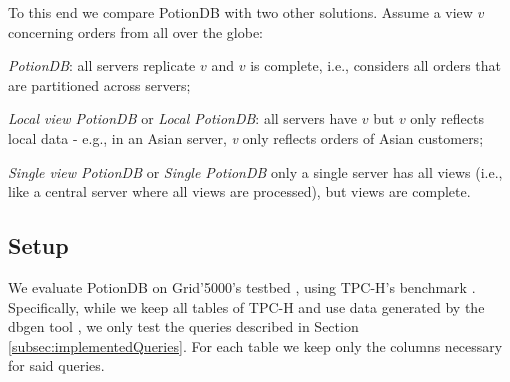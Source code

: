 \documentclass[sigplan,review,anonymous]{acmart}
\begin{document}
To this end we compare PotionDB with two other solutions.
Assume a view $v$ concerning orders from all over the globe:

\begin{compactitem}
	\item \emph{PotionDB}: all servers replicate $v$ and $v$ is complete, i.e., considers all orders that are partitioned across servers;
	\item \emph{Local view PotionDB} or \emph{Local PotionDB}: all servers have $v$ but $v$ only reflects local data - e.g., in an Asian server, \emph{v} only reflects orders of Asian customers;
	\item \emph{Single view PotionDB} or \emph{Single PotionDB} only a single server has all views (i.e., like a central server where all views are processed), but views are complete.
\end{compactitem}



\subsection{Setup}
\label{subsec:setup}

We evaluate PotionDB on Grid'5000's testbed \cite{Grid5000}, using TPC-H's benchmark \cite{tpch}.
Specifically, while we keep all tables of TPC-H and use data generated by the dbgen tool \cite{tpch}, we only test the queries described in Section \ref{subsec:implementedQueries}.
For each table we keep only the columns necessary for said queries. 
\end{document}
